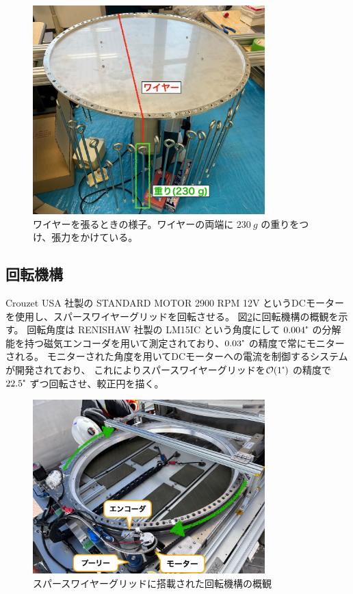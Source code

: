 \documentclass[../../main.tex]{subfiles}
\begin{document}
\begin{figure}[H]
    \centering
    \includegraphics[width=0.8\textwidth]{wiregrid/wire_attachment.pdf}
    \caption[ワイヤーを張るときの様子]{ワイヤーを張るときの様子。ワイヤーの両端に $\SI{230}{g}$ の重りをつけ、張力をかけている。}
    \label{fig:wire_attachment}
\end{figure}
\subsection{回転機構}
Crouzet USA 社製の STANDARD MOTOR 2900 RPM 12V というDCモーターを使用し、スパースワイヤーグリッドを回転させる。
図\ref{fig:rotation_parts}に回転機構の概観を示す。
回転角度は RENISHAW 社製の LM15IC という角度にして $0.004\tcdegree$ の分解能を持つ磁気エンコーダを用いて測定されており、$0.03\tcdegree$ の精度で常にモニターされる。
モニターされた角度を用いてDCモーターへの電流を制御するシステムが開発されており、
これによりスパースワイヤーグリッドを$\order{1\tcdegree}$ の精度で $22.5\tcdegree$ ずつ回転させ、較正円を描く\cite{swg:nakata}。
\begin{figure}[H]
    \centering
    \includegraphics[width=0.8\textwidth]{wiregrid/rotation_parts.pdf}
    \caption{スパースワイヤーグリッドに搭載された回転機構の概観}
    \label{fig:rotation_parts}
\end{figure}
\end{document}
